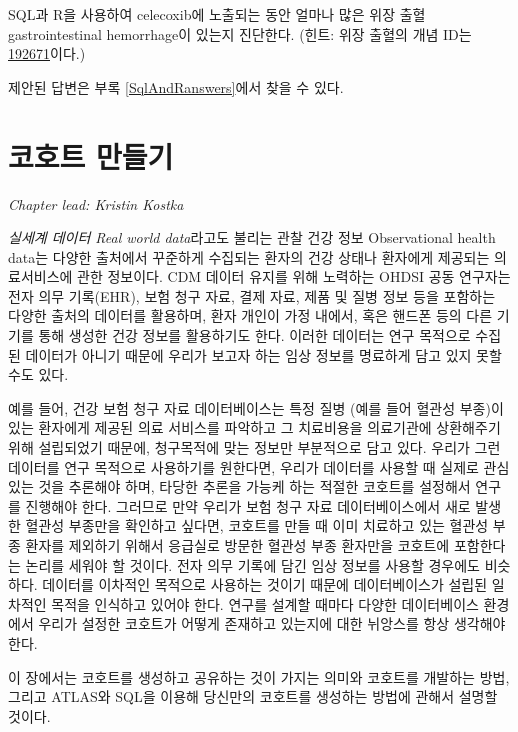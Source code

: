 \documentclass[10.5pt]{book}
\theoremstyle{definition}
\theoremstyle{definition}
\theoremstyle{definition}
\theoremstyle{remark}
\begin{document}
\protect\hypertarget{exr:exerciseGiBleedsDuringCelecoxib}{}{\label{exr:exerciseGiBleedsDuringCelecoxib}
}SQL과 R을 사용하여 celecoxib에 노출되는 동안 얼마나 많은 위장
출혈gastrointestinal hemorrhage이 있는지 진단한다. (힌트: 위장 출혈의
개념 ID는
\href{http://athena.ohdsi.org/search-terms/terms/192671}{192671}이다.)

제안된 답변은 부록 \ref{SqlAndRanswers}에서 찾을 수 있다.

\chapter{코호트 만들기}\label{Cohorts}

\emph{Chapter lead: Kristin Kostka}

\emph{실세계 데이터 Real world data}라고도 불리는 관찰 건강 정보
Observational health data는 다양한 출처에서 꾸준하게 수집되는 환자의
건강 상태나 환자에게 제공되는 의료서비스에 관한 정보이다. CDM 데이터
유지를 위해 노력하는 OHDSI 공동 연구자는 전자 의무 기록(EHR), 보험 청구
자료, 결제 자료, 제품 및 질병 정보 등을 포함하는 다양한 출처의 데이터를
활용하며, 환자 개인이 가정 내에서, 혹은 핸드폰 등의 다른 기기를 통해
생성한 건강 정보를 활용하기도 한다. 이러한 데이터는 연구 목적으로 수집된
데이터가 아니기 때문에 우리가 보고자 하는 임상 정보를 명료하게 담고 있지
못할 수도 있다.

예를 들어, 건강 보험 청구 자료 데이터베이스는 특정 질병 (예를 들어
혈관성 부종)이 있는 환자에게 제공된 의료 서비스를 파악하고 그 치료비용을
의료기관에 상환해주기 위해 설립되었기 때문에, 청구목적에 맞는 정보만
부분적으로 담고 있다. 우리가 그런 데이터를 연구 목적으로 사용하기를
원한다면, 우리가 데이터를 사용할 때 실제로 관심 있는 것을 추론해야 하며,
타당한 추론을 가능케 하는 적절한 코호트를 설정해서 연구를 진행해야 한다.
그러므로 만약 우리가 보험 청구 자료 데이터베이스에서 새로 발생한 혈관성
부종만을 확인하고 싶다면, 코호트를 만들 때 이미 치료하고 있는 혈관성
부종 환자를 제외하기 위해서 응급실로 방문한 혈관성 부종 환자만을
코호트에 포함한다는 논리를 세워야 할 것이다. 전자 의무 기록에 담긴 임상
정보를 사용할 경우에도 비슷하다. 데이터를 이차적인 목적으로 사용하는
것이기 때문에 데이터베이스가 설립된 일차적인 목적을 인식하고 있어야
한다. 연구를 설계할 때마다 다양한 데이터베이스 환경에서 우리가 설정한
코호트가 어떻게 존재하고 있는지에 대한 뉘앙스를 항상 생각해야 한다.

이 장에서는 코호트를 생성하고 공유하는 것이 가지는 의미와 코호트를
개발하는 방법, 그리고 ATLAS와 SQL을 이용해 당신만의 코호트를 생성하는
방법에 관해서 설명할 것이다.
\end{document}
